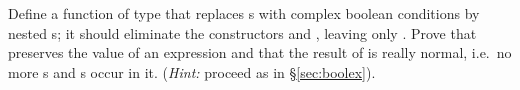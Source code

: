 \begin{isabellebody}
\begin{isamarkuptext}
\begin{exercise}
  Define a function  of type  that
  replaces s with complex boolean conditions by nested
  s; it should eliminate the constructors
   and , leaving only .
  Prove that 
  preserves the value of an expression and that the result of 
  is really normal, i.e.\ no more s and s occur in
  it.  ({\em Hint:} proceed as in \S\ref{sec:boolex}).
\end{exercise}%
\end{isamarkuptext}%
\isamarkuptrue%
\isamarkupfalse%
\end{isabellebody}%
